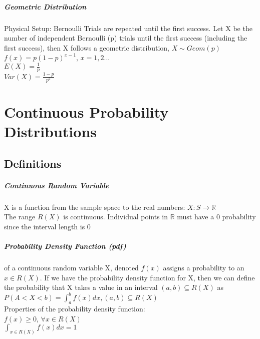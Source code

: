\documentclass[12pt]{report}
\begin{document}
      \paragraph{Geometric Distribution}
        Physical Setup: Bernoulli Trials are repeated until the first success.
        Let X be the number of independent Bernoulli (p) trials until the first
        success (including the first success), then X follows a geometric
        distribution, $X \sim Geom(p)$\\
        $f(x) = p(1-p)^{x-1}$, $x = 1, 2 ...$\\
        $E(X) = \frac{1}{p}$\\
        $Var(X) = \frac{1-p}{p^2}$



\chapter{Continuous Probability Distributions}
  \section{Definitions}
    \paragraph{Continuous Random Variable} X is a function from the sample
    space to the real numbers: $X : S \rightarrow \mathbb{R}$\\
    The range $R(X)$ is continuous. Individual points in $\mathbb{R}$ must have
    a 0 probability since the interval length is 0\\

    \paragraph{Probability Density Function (pdf)} of a continuous random
    variable X, denoted $f(x)$ assigns a probability to an $x \in R(X)$. If we
    have the probability density function for X, then we can define the
    probability that X takes a value in an interval $(a, b) \subseteq R(X)$ as
    $P(A < X < b) = \int_{a}^{b} f(x)dx, (a, b) \subseteq R(X)$\\
    Properties of the probability density function:\\
    $f(x) \geq 0$, $\forall x \in R(X)$\\
    $\int_{x\in R(X)} f(x)dx = 1$
\end{document}

